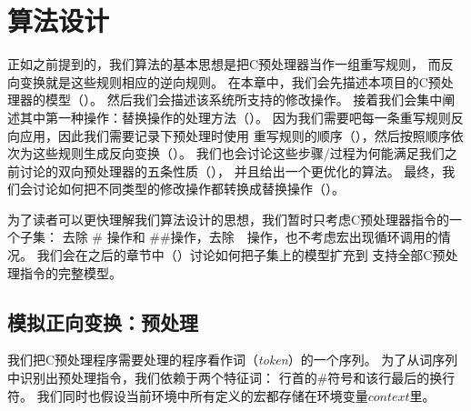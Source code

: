 \chapter{算法设计}
\label{sec:approach}
正如之前提到的，我们算法的基本思想是把C预处理器当作一组重写规则，
而反向变换就是这些规则相应的逆向规则。
在本章中，我们会先描述本项目的C预处理器的模型（）。
然后我们会描述该系统所支持的修改操作。
接着我们会集中阐述其中第一种操作：替换操作的处理方法（）。
因为我们需要吧每一条重写规则反向应用，因此我们需要记录下预处理时使用
重写规则的顺序（），然后按照顺序依次为这些规则生成反向变换（）。
我们也会讨论这些步骤/过程为何能满足我们之前讨论的双向预处理器的五条性质（），
并且给出一个更优化的算法。
最终，我们会讨论如何把不同类型的修改操作都转换成替换操作（）。



为了读者可以更快理解我们算法设计的思想，我们暂时只考虑C预处理器指令的一个子集：
去除 \# 操作和 \#\#操作，去除~~操作，也不考虑宏出现循环调用的情况。
我们会在之后的章节中（）讨论如何把子集上的模型扩充到
支持全部C预处理指令的完整模型。

\newcommand{\dstart}{\ensuremath{\langle\#}\xspace}
\newcommand{\dend}{\ensuremath{\rangle}\xspace}

\section{模拟正向变换：预处理}\label{sec:forward}
我们把C预处理程序需要处理的程序看作词（\emph{token}）的一个序列。
为了从词序列中识别出预处理指令，我们依赖于两个特征词：
行首的\#符号和该行最后的换行符。
我们同时也假设当前环境中所有定义的宏都存储在环境变量\emph{$context$}里。

